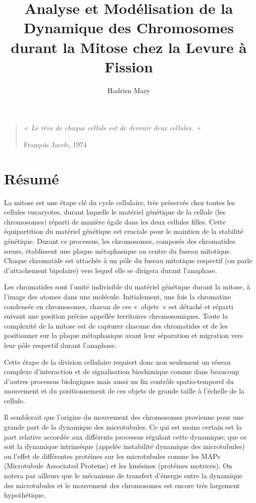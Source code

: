 \documentclass[12pt,a4paper,twoside,openright]{book}
\date{}
\title{Analyse et Modélisation de la Dynamique des Chromosomes durant la Mitose chez la Levure à Fission}
\author{Hadrien Mary}
\begin{document}
\makeflyleaf

\newpage

\pagestyle{empty}

\vspace*{\fill}

\begin{quote}
    {\centerline {\itshape «\ Le rêve de chaque cellule est de devenir deux cellules.\ »}}
    \centerline{François Jacob, 1974}
  \end{quote}\vspace*{\fill}

\newpage

\cleardoublepage
\clearpage\null

\section*{Résumé}

La mitose est une étape clé du cycle cellulaire, très préservée chez
toutes les cellules eucaryotes, durant laquelle le matériel génétique de
la cellule (les chromosomes) réparti de manière égale dans les deux
cellules filles. Cette équipartition du matériel génétique est cruciale
pour le maintien de la stabilité génétique. Durant ce processus, les
chromosomes, composés des chromatides sœurs, établissent une plaque
métaphasique au centre du fuseau mitotique. Chaque chromatide est
attachée à un pôle du fuseau mitotique respectif (on parle d'attachement
bipolaire) vers lequel elle se dirigera durant l'anaphase.

Les chromatides sont l'unité indivisible du matériel génétique durant la
mitose, à l'image des atomes dans une molécule. Initialement, une fois
la chromatine condensée en chromosomes, chacun de ces «~objets~» est
détaché et réparti suivant une position précise appellée territoires
chromosomiques. Toute la complexité de la mitose est de capturer chacune
des chromatides et de les positionner sur la plaque métaphasique avant
leur séparation et migration vers leur pôle respectif durant l'anaphase.

Cette étape de la division cellulaire requiert donc non seulement un
réseau complexe d'interaction et de signalisation biochimique comme dans
beaucoup d'autres processus biologiques mais aussi un fin contrôle
spatio-temporel du mouvement et du positionnement de ces objets de
grande taille à l'échelle de la cellule.

Il semblerait que l'origine du mouvement des chromosomes provienne pour
une grande part de la dynamique des microtubules. Ce qui est moins
certain est la part relative accordée aux différents processus régulant
cette dynamique; que ce soit la dynamique intrinsèque (appelée
instabilité dynamique des microtubules) ou l'effet de différentes
protéines sur les microtubules comme les MAPs (Microtubule Associated
Proteins) et les kinésines (protéines motrices). On notera par ailleurs
que le mécanisme de transfert d'énergie entre la dynamique des
microtubules et le mouvement des chromosomes est encore très largement
hypothétique.
\end{document}
